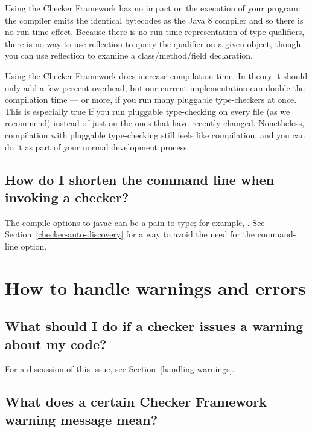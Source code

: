 Using the Checker Framework has no impact on the execution of your program:
the compiler emits the identical bytecodes as the Java 8
compiler and so there is no run-time effect.  Because there is no run-time
representation of type qualifiers, there is no way to use reflection to
query the qualifier on a given object, though you can use reflection to
examine a class/method/field declaration.

Using the Checker Framework does increase compilation time.  In theory it
should only add a few percent overhead, but our current implementation
can double the compilation time --- or more, if you run many pluggable
type-checkers at once.  This is especially true if you run pluggable
type-checking on every file (as we recommend) instead of just on the ones
that have recently changed.
Nonetheless, compilation with pluggable type-checking still feels like
compilation, and you can do it as part of your normal development process.


\subsection{How do I shorten the command line when invoking a checker?\label{faq-shorten-command-line}}

\begin{sloppypar}
The compile options to javac can be a pain to type; for example,
.
See Section~\ref{checker-auto-discovery} for a way to avoid the need for
the  command-line option.
\end{sloppypar}


\section{How to handle warnings and errors\label{faq-warnings-section}}

\subsection{What should I do if a checker issues a warning about my code?\label{faq-handling-warnings}}

For a discussion of this issue, see Section~\ref{handling-warnings}.


\subsection{What does a certain Checker Framework warning message mean?\label{faq-interpreting-warnings}}


